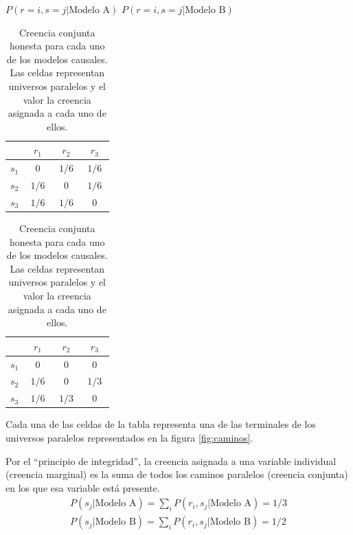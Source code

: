 \documentclass[a4paper,11pt]{book}
\theoremstyle{definition}
\begin{document}
\begin{table}[ht!]
\centering
$P(r=i, s=j | \text{Modelo A})$ \hspace{1.8cm} $P(r=i, s=j | \text{Modelo B})$ \\[0.1cm]
 \begin{tabular}{|c|c|c|c|} \hline \setlength\tabcolsep{0.4cm}
       & \, $r_1$ \, &  \, $r_2$ \, & \, $r_3$ \, \\ \hline
  $s_1$ & $0$ & $1/6$ & $1/6$  \\ \hline
  $s_2$ & $1/6$ & $0$ & $1/6$  \\ \hline
  $s_3$ & $1/6$ & $1/6$ & $0$ \\ \hline
  \end{tabular}
  \hspace{1.5cm}
  \begin{tabular}{|c|c|c|c|} \hline  \setlength\tabcolsep{0.4cm}
 & \, $r_1$ \, &  \, $r_2$ \, & \, $r_3$ \,  \\ \hline
  $s_1$ & $0$ & $0$ & $0$ \\ \hline
  $s_2$ & $1/6$ & $0$ & $1/3$ \\ \hline
  $s_3$ & $1/6$ & $1/3$ & $0$  \\ \hline
  \end{tabular}
  \caption{Creencia conjunta honesta para cada uno de los modelos causales. Las celdas representan universos paralelos y el valor la creencia asignada a cada uno de ellos.}
  \label{tab:creencia_conjunta}
\end{table}
%
%
Cada una de las celdas de la tabla representa una de las terminales de los universos paralelos representados en la figura \ref{fig:caminos}.


Por el ``principio de integridad'', la creencia asignada a una variable individual (creencia marginal) es la suma de todos los caminos paralelos (creencia conjunta) en los que esa variable está presente.
%
\begin{equation}
\begin{split}
P(s_j|\text{Modelo A}) = \sum_i P(r_i, s_j|\text{Modelo A}) = 1/3 \\  P(s_j|\text{Modelo B}) = \sum_i P(r_i, s_j|\text{Modelo B}) = 1/2
\end{split}
\end{equation}
\end{document}
